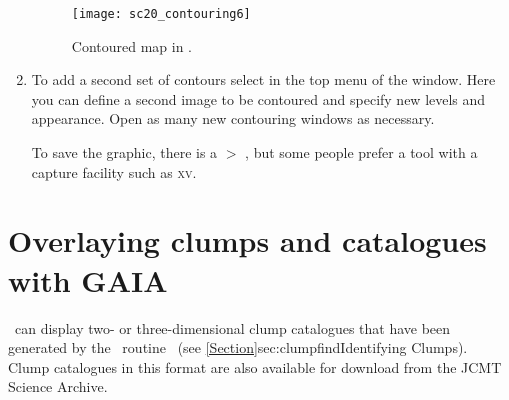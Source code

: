 \documentclass[11pt,oneside,chapters]{starlink}
\begin{document}
\begin{enumerate}[label=(\textbf{\arabic*})]
\begin{figure}[h!]
\begin{center}
\texttt{[image: sc20\_contouring6]}
\caption[Contoured map in \gaia.]{\label{fig:gaia_contour3}
  Contoured map in \gaia.}
\end{center}
\end{figure}

\item To add a second set of contours select  in the top menu of the  window. Here you
can define a second image to be contoured and specify new levels and
appearance. Open as many new contouring windows as necessary.

To save the graphic, there is a  $>$ ,
but some people prefer a tool with a capture facility such as
\textsc{xv}.

\end{enumerate}

\section{Overlaying clumps and catalogues with GAIA}
\label{sec:plotclumps}

\gaia\ can display two- or three-dimensional clump catalogues that
have been generated by the \cupid\ routine \findclumps\ (see
\cref{Section}{sec:clumpfind}{Identifying Clumps}). Clump catalogues
in this format are also available for download from the JCMT Science
Archive.
\end{document}
